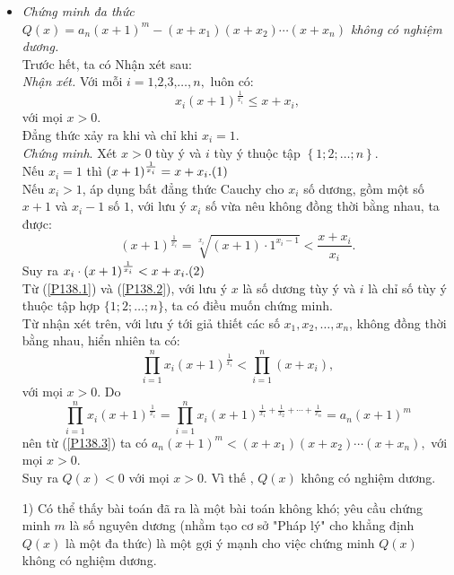 \begin{bt}
{\begin{itemize}
			\item \textit{Chứng minh đa thức $ Q(x) =a_n(x+1)^m -(x+x_1)(x+x_2)\cdots (x+x_n)$ không có nghiệm dương.}\\
			Trước hết, ta có Nhận xét sau:\\
			\textit{Nhận xét.} Với mỗi $ i=1\text{,}2\text{,}3\text{,}\ldots,n, $ luôn có: $$ x_i(x+1)^{\frac{1}{x_i}} \le x+x_i, $$ với mọi $ x>0$.\\
			Đẳng thức xảy ra khi và chỉ khi $ x_i=1. $\\
			\textit{Chứng minh}. Xét $ x>0 $ tùy ý và $ i $ tùy ý thuộc tập $ \left\{ 1;2;\ldots; n\right\}  $.\\
			Nếu $ x_i =1 $ thì $ \left(x+1\right)^{\frac{1}{x_i}} =x+x_i. \refstepcounter{equation}\hfill (\theequation)\label{P138.1} $\\
			Nếu $ x_i>1 $, áp dụng bất đẳng thức Cauchy cho $ x_i $ số dương, gồm một số $ x+1 $ và $ x_i-1 $ số $ 1 $, với lưu ý $ x_i $ số vừa nêu không đồng thời bằng nhau, ta được:
			$$ (x+1)^{\frac{1}{x_i}} =\sqrt[x_i]{(x+1)\cdot 1^{x_i-1}} <\dfrac{x+x_i}{x_i}.$$
			Suy ra $ x_i\cdot (x+1)^{\frac{1}{x_i}}< x+x_i. \refstepcounter{equation}\hfill (\theequation)\label{P138.2}$\\
			Từ (\ref{P138.1}) và (\ref{P138.2}), với lưu ý $ x $ là số dương tùy ý và $ i $ là chỉ số tùy ý thuộc tập hợp $\{1;2;\ldots;n\} $, ta có điều muốn chứng minh.\\
			Từ nhận xét trên, với lưu ý tới giả thiết các số $ x_1,x_2,\ldots, x_n $, không đồng thời bằng nhau, hiển nhiên ta có:\\
			\begin{equation}\label{P138.3} \prod\limits_{i=1}^{n} {x_i(x+1)^{\frac{1}{x_i}}}<\prod\limits_{i=1}^{n} (x+x_i),   
			\end{equation}
			với mọi $ x>0 $. Do 
			$$ \prod\limits_{i=1}^{n}x_i(x+1)^{\frac{1}{x_i}} =\prod\limits_{i=1}^nx_i(x+1)^{\frac{1}{x_1}+\frac{1}{x_2}+\cdots +\frac{1}{x_n}}  =a_n(x+1)^m$$
			nên từ (\ref{P138.3}) ta có $ a_n(x+1)^m<(x+x_1)(x+x_2)\cdots (x+x_n) ,$ với mọi $ x>0 .$\\
			Suy ra $ Q(x) <0$ với mọi $ x>0 .$ Vì thế , $ Q(x) $ không có nghiệm dương.
		\end{itemize}	
	\begin{nx}\hfill
		\begin{enumerate}
\item [1)]	 Có thể thấy bài toán đã ra là một bài toán không khó; yêu cầu chứng minh $ m $ là số nguyên dương (nhằm tạo cơ sở "Pháp lý" cho khẳng định $ Q(x) $ là một đa thức) là một gợi ý mạnh cho việc chứng minh $ Q(x) $ không có nghiệm dương.

\end{enumerate}
\end{nx}}
\end{bt}
